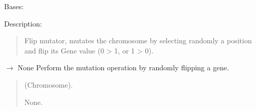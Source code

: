\documentclass[letterpaper,10pt,english]{sphinxmanual}
\begin{document}
\begin{fulllineitems}
\label{\detokenize{pygenalgo.operators.mutation:pygenalgo.operators.mutation.flip_mutator.FlipMutator}}
\pysigstartsignatures
\pysiglinewithargsret
{}
{}
{}
\pysigstopsignatures
\sphinxAtStartPar
Bases: {\hyperref[\detokenize{pygenalgo.operators.mutation:pygenalgo.operators.mutation.mutate_operator.MutationOperator}]{}}

\sphinxAtStartPar
Description:
\begin{quote}

\sphinxAtStartPar
Flip mutator, mutates the chromosome by selecting randomly
a position and flip its Gene value (0 \sphinxhyphen{}\textgreater{} 1, or 1 \sphinxhyphen{}\textgreater{} 0).
\end{quote}

\begin{fulllineitems}
\label{\detokenize{pygenalgo.operators.mutation:pygenalgo.operators.mutation.flip_mutator.FlipMutator.mutate}}
\pysigstartsignatures
\pysiglinewithargsret
{}
{}
{{ $\rightarrow$ None}}
\pysigstopsignatures
\sphinxAtStartPar
Perform the mutation operation by randomly flipping a gene.
\begin{quote}\begin{description}
\sphinxAtStartPar
{} \textendash{} (Chromosome).

\sphinxAtStartPar
None.

\end{description}\end{quote}

\end{fulllineitems}


\end{fulllineitems}
\end{document}
